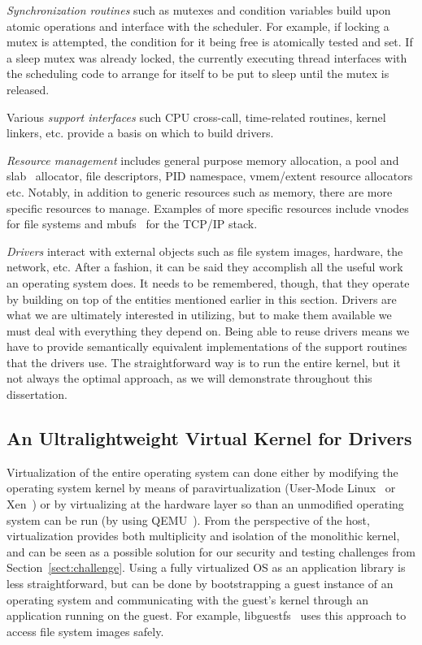 \textit{Synchronization routines} such as mutexes and condition
variables build upon atomic operations and interface with the scheduler.
For example, if locking a mutex is attempted, the condition for it being
free is atomically tested and set.  If a sleep mutex was already locked,
the currently executing thread interfaces with the scheduling code to
arrange for itself to be put to sleep until the mutex is released.

Various \textit{support interfaces} such CPU cross-call, time-related
routines, kernel linkers, etc. provide a basis on which to build drivers.

\textit{Resource management} includes general purpose memory
allocation, a pool and slab~\cite{bonwick:slab} allocator, file
descriptors, PID namespace, vmem/extent resource allocators etc.
Notably, in addition to generic resources such as memory,
there are more specific resources to manage.  Examples
of more specific resources include vnodes~\cite{kleiman:vnodes} for file
systems and mbufs~\cite{stevens:tcpip2} for the TCP/IP stack.

\textit{Drivers} interact with external objects such as file
system images, hardware, the network, etc.  After a fashion, it
can be said they accomplish all the useful work an operating system
does.  It needs to be remembered, though, that they operate
by building on top of the entities mentioned earlier in this section.
Drivers are what we are ultimately interested in utilizing, but to
make them available we must deal with everything they depend on.
Being able to reuse drivers means we have to provide semantically
equivalent implementations of the support routines that the drivers use.
The straightforward way is to run the entire kernel, but it not always
the optimal approach, as we will demonstrate throughout this dissertation.

\subsection{An Ultralightweight Virtual Kernel for Drivers}
\label{sect:conceptintro}

Virtualization of the entire operating system can done either by
modifying the operating system kernel by means of paravirtualization
(\eg User-Mode Linux~\cite{dike:uml} or Xen~\cite{barham:xen}) or by virtualizing at the
hardware layer so than an unmodified operating system can be run
(by using \eg QEMU~\cite{bellard:qemu}).  From the perspective of
the host, virtualization provides both multiplicity and isolation
of the monolithic kernel, and can be seen as a possible solution
for our security and testing challenges from Section~\ref{sect:challenge}.
Using a fully virtualized OS as an application library is less
straightforward, but can be done by bootstrapping a guest instance
of an operating system and communicating with the guest's kernel
through an application running on the guest.  For example,
libguestfs~\cite{libguestfs} uses this approach to access file
system images safely.

